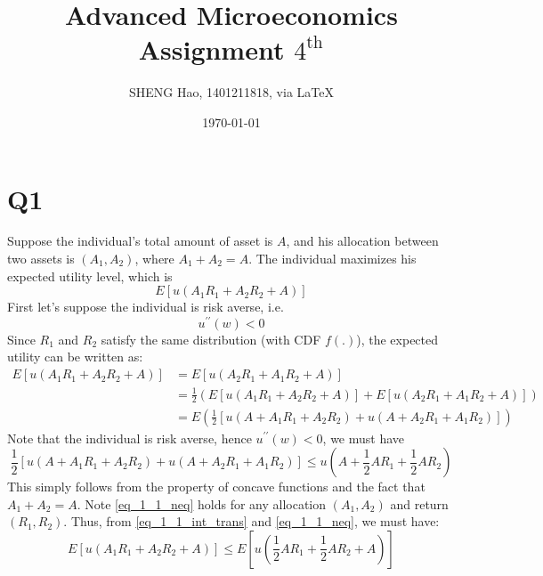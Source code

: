 \documentclass{article}
\begin{document}
\title{Advanced Microeconomics\\Assignment $4^{\text{th}}$}
\author{{\normalsize SHENG Hao, 1401211818, via \LaTeX}}
\date{\today}

\maketitle

\def \Pr{{\rm Pr}}
\baselineskip 0.6cm
\section*{Q1}
Suppose the individual's total amount of asset is $A$, and his allocation between two assets is $\left(A_1,A_2\right)$, where $A_1+A_2=A$. The individual maximizes his expected utility level, which is
\begin{equation}
	E\left[u\left(A_1 R_1+A_2 R_2+A\right)\right]
\end{equation}
First let's suppose the individual is risk averse, i.e.
\begin{equation}
	u^{\prime\prime}(w) < 0
\end{equation}
Since $R_1$ and $R_2$ satisfy the same distribution (with CDF $f(.)$), the expected utility can be written as:
\begin{equation}
	\label{eq_1_1_int_trans}
	\begin{aligned}
		E\left[u\left(A_1 R_1+A_2 R_2+A\right)\right] & = E\left[u\left(A_2 R_1+A_1 R_2+A\right)\right] \\
		& = \frac{1}{2} \left( E\left[u\left(A_1 R_1+A_2 R_2+A\right)\right] +  E\left[u\left(A_2 R_1+A_1 R_2+A\right)\right] \right) \\
		& = E \left( \frac{1}{2} \left[ u(A+A_1 R_1 + A_2 R_2) + u(A+A_2 R_1 + A_1 R_2) \right] \right)
	\end{aligned}
\end{equation}
Note that the individual is risk averse, hence $u^{\prime\prime}(w) < 0$, we must have
\begin{equation}
	\label{eq_1_1_neq}
	\frac{1}{2} \left[ u(A+A_1 R_1 + A_2 R_2) + u(A+A_2 R_1 + A_1 R_2) \right] \leq u \left( A+\frac{1}{2}A R_1 + \frac{1}{2}A R_2 \right)
\end{equation}
This simply follows from the property of concave functions and the fact that $A_1 + A_2 = A$. Note \eqref{eq_1_1_neq} holds for any allocation $(A_1, A_2)$ and return $(R_1, R_2)$. Thus, from \eqref{eq_1_1_int_trans} and \eqref{eq_1_1_neq}, we must have:
\begin{equation}
	E\left[u\left(A_1 R_1+A_2 R_2+A\right)\right] \leq E\left[u\left(\frac{1}{2} A R_1+  \frac{1}{2} A R_2+A\right)\right]
\end{equation}
\end{document}

